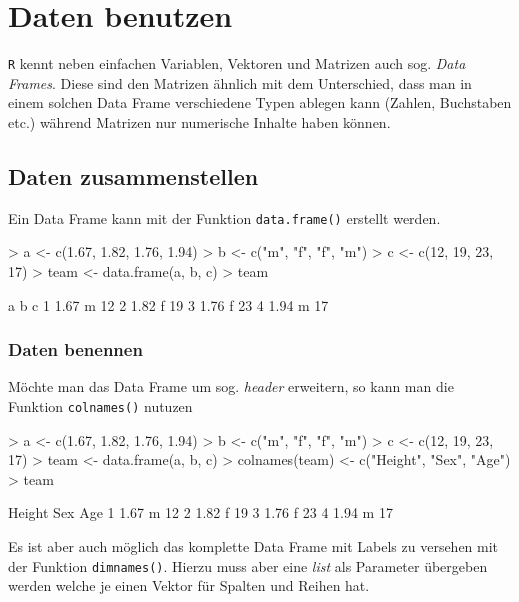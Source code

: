 \clearpage
\section{Daten benutzen}
\lstinline{R} kennt neben einfachen Variablen, Vektoren und Matrizen
auch sog. \emph{Data Frames}. Diese sind den Matrizen ähnlich mit dem
Unterschied, dass man in einem solchen Data Frame verschiedene Typen
ablegen kann (Zahlen, Buchstaben etc.) während Matrizen nur
numerische Inhalte haben können.

\subsection{Daten zusammenstellen}
Ein Data Frame kann mit der Funktion \lstinline{data.frame()} erstellt
werden.

\begin{Schunk}
\begin{Sinput}
> a <- c(1.67, 1.82, 1.76, 1.94)
> b <- c("m", "f", "f", "m")
> c <- c(12, 19, 23, 17)
> team <- data.frame(a, b, c)
> team
\end{Sinput}
\begin{Soutput}
     a b  c
1 1.67 m 12
2 1.82 f 19
3 1.76 f 23
4 1.94 m 17
\end{Soutput}
\end{Schunk}

\subsubsection{Daten benennen}
Möchte man das Data Frame um sog. \emph{header} erweitern,
so kann man die Funktion \lstinline{colnames()} nutuzen

\begin{Schunk}
\begin{Sinput}
> a <- c(1.67, 1.82, 1.76, 1.94)
> b <- c("m", "f", "f", "m")
> c <- c(12, 19, 23, 17)
> team <- data.frame(a, b, c)
> colnames(team) <- c("Height", "Sex", "Age")
> team
\end{Sinput}
\begin{Soutput}
  Height Sex Age
1   1.67   m  12
2   1.82   f  19
3   1.76   f  23
4   1.94   m  17
\end{Soutput}
\end{Schunk}

\noindent
Es ist aber auch möglich das komplette Data Frame mit Labels
zu versehen mit der Funktion \lstinline{dimnames()}. Hierzu
muss aber eine \emph{list} als Parameter übergeben werden
welche je einen Vektor für Spalten und Reihen hat.


